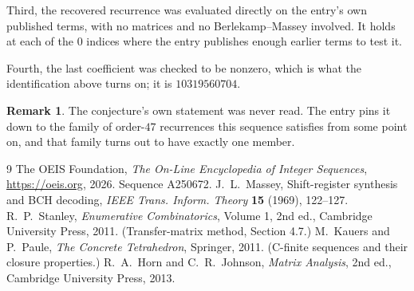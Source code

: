\documentclass[11pt,a4paper]{article}
\theoremstyle{plain}
\theoremstyle{definition}
\newtheorem{remark}[theorem]{Remark}
\begin{document}
Third, the recovered recurrence was evaluated directly on the entry's own published terms, with
no matrices and no Berlekamp--Massey involved. It holds at each of the $0$ indices where
the entry publishes enough earlier terms to test it.

Fourth, the last coefficient was checked to be nonzero, which is what the identification above
turns on; it is $10319560704$.

\begin{remark}
The conjecture's own statement was never read. The entry pins it down to the family of
order-$47$ recurrences this sequence satisfies from some point on, and that family turns
out to have exactly one member.
\end{remark}

\begin{thebibliography}{9}
 The OEIS Foundation, \emph{The On-Line Encyclopedia of Integer
Sequences}, \url{https://oeis.org}, 2026. Sequence A250672.
 J.~L.~Massey, Shift-register synthesis and BCH decoding, \emph{IEEE
Trans. Inform. Theory} \textbf{15} (1969), 122--127.
 R.~P.~Stanley, \emph{Enumerative Combinatorics}, Volume 1, 2nd ed.,
Cambridge University Press, 2011. (Transfer-matrix method, Section 4.7.)
 M.~Kauers and P.~Paule, \emph{The Concrete Tetrahedron}, Springer, 2011.
(C-finite sequences and their closure properties.)
 R.~A.~Horn and C.~R.~Johnson, \emph{Matrix Analysis}, 2nd ed., Cambridge
University Press, 2013.
\end{thebibliography}
\end{document}
